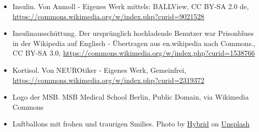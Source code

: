 \documentclass{beamer}
\begin{document}
\begin{frame}
\begin{tiny}
\begin{itemize}
\item
Insulin. Von Anmoll - Eigenes Werk mittels: BALLView, CC BY-SA 2.0 de, \url{https://commons.wikimedia.org/w/index.php?curid=9021528}

\item
Insulinausschüttung. Der ursprünglich hochladende Benutzer war Prisonblues in der Wikipedia auf Englisch - Übertragen aus en.wikipedia nach Commons., CC BY-SA 3.0, \url{https://commons.wikimedia.org/w/index.php?curid=1538766}

\item
Kortisol. Von NEUROtiker - Eigenes Werk, Gemeinfrei, \url{https://commons.wikimedia.org/w/index.php?curid=2319372}

\item
Logo der MSB. MSB Medical School Berlin, Public Domain, via Wikimedia Commons


\item
Luftballons mit frohen und traurigen Smilies. Photo by \href{https://unsplash.com/@artbyhybrid?utm_source=unsplash&utm_medium=referral&utm_content=creditCopyText}{Hybrid} on \href{https://unsplash.com/s/photos/feedback?utm_source=unsplash&utm_medium=referral&utm_content=creditCopyText}{Unsplash}
\end{itemize}
\end{tiny}
\end{frame}
\end{document}
